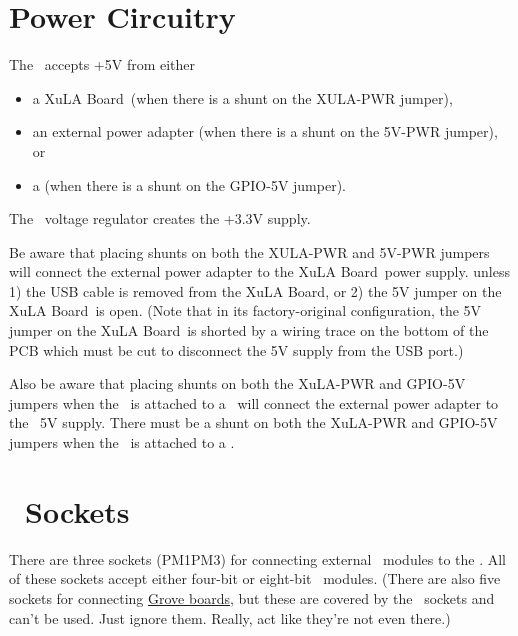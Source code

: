 \documentclass[letterpaper,11pt,oneside]{memoir}
\newcommand{\xula}{XuLA Board}
\begin{document}
\section{Power Circuitry}

The \product\ accepts +5V from either
\begin{itemize} 
\item a \xula\ (when there is a shunt on the XULA-PWR jumper),
\item an external power adapter (when there is a shunt on the 5V-PWR jumper), or
\item a \rpi (when there is a shunt on the GPIO-5V jumper).
\end{itemize}

The \product\ voltage regulator creates the +3.3V supply.


Be aware that placing shunts on both the XULA-PWR and 5V-PWR jumpers will
connect the external power adapter to the \xula\ power supply. 
 unless 1) the USB cable is removed from the \xula,
or 2) the 5V jumper on the \xula\ is open.
(Note that in its factory-original
configuration, the 5V jumper on the \xula\ is shorted by a wiring trace on
the bottom of the PCB which must be cut to disconnect the 5V supply from the
USB port.)

Also be aware that placing shunts on both the XuLA-PWR and GPIO-5V jumpers
when the \product\ is attached to a \rpi\
will connect the external power adapter to the \rpi\ 5V supply.
There must  be a shunt on both the XuLA-PWR and GPIO-5V jumpers 
when the \product\ is attached to a \rpi.


\pagebreak %

\section{\digpmod\ Sockets}

There are three sockets (PM1\textendash PM3) for connecting external \digpmod\ modules 
to the \product.
All of these sockets accept either four-bit or eight-bit \digpmod\ modules.
(There are also five sockets for connecting 
\href{http://www.seeedstudio.com/wiki/Category:Grove}{Grove boards},
but these are covered by the \digpmod\ sockets and can't be used. 
Just ignore them. 
Really, act like they're not even there.)
\end{document}
